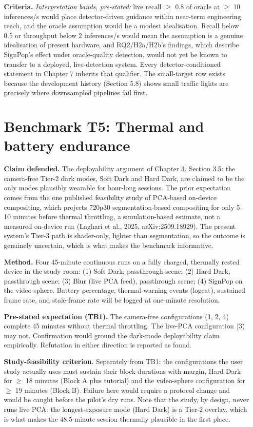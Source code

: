 \textbf{Criteria.} \textit{Interpretation bands, pre-stated:} live recall $\geq$ 0.8 of oracle at $\geq$ 10 inferences/s
would place detector-driven guidance within near-term engineering reach, and the oracle assumption
would be a modest idealisation. Recall below 0.5 or throughput below 2 inferences/s would mean the
assumption is a genuine idealisation of present hardware, and RQ2/H2a/H2b's findings, which
describe SignPop's effect under oracle-quality detection, would not yet be known to transfer to a
deployed, live-detection system. Every detector-conditioned statement in Chapter 7 inherits that
qualifier. The small-target row exists because the development history (Section 5.8) shows small
traffic lights are precisely where downsampled pipelines fail first.

\section{Benchmark T5: Thermal and battery endurance}

\textbf{Claim defended.} The deployability argument of Chapter 3, Section 3.5: the camera-free Tier-2
dark modes, Soft Dark and Hard Dark, are claimed to be the only modes plausibly wearable for
hour-long sessions. The prior expectation comes from the one published
feasibility study of PCA-based on-device compositing, which projects 720p30 segmentation-based
compositing for only 5–10 minutes before thermal throttling, a simulation-based estimate, not a
measured on-device run (Laghari et al., 2025, arXiv:2509.18929). The present system's Tier-3 path is
shader-only, lighter than segmentation, so the outcome is genuinely uncertain, which is what
makes the benchmark informative.

\textbf{Method.} Four 45-minute continuous runs on a fully charged, thermally rested device in the study
room: (1) Soft Dark, passthrough scene; (2) Hard Dark, passthrough scene; (3) Blur (live PCA feed),
passthrough scene; (4) SignPop on the video sphere. Battery percentage, thermal-warning events
(logcat), sustained frame rate, and stale-frame rate will be logged at one-minute resolution.

\textbf{Pre-stated expectation (TB1).} The camera-free configurations (1, 2, 4) complete 45 minutes
without thermal throttling. The live-PCA configuration (3) may not. Confirmation would ground the
dark-mode deployability claim empirically. Refutation in either direction is reported as found.

\textbf{Study-feasibility criterion.} Separately from TB1: the configurations the user study actually
uses must sustain their block durations with margin, Hard Dark for $\geq$ 18 minutes (Block A plus
tutorial) and the video-sphere configuration for $\geq$ 19 minutes (Block B). Failure here would
require a protocol change and would be caught before the pilot's dry runs. Note that the study, by
design, never runs live PCA: the longest-exposure mode (Hard Dark) is a Tier-2 overlay, which is
what makes the 48.5-minute session thermally plausible in the first place.

